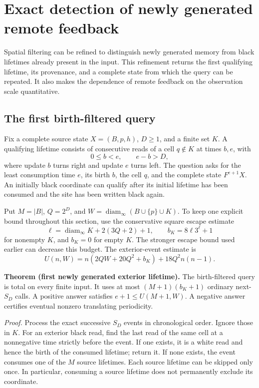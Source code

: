 \section{Exact detection of newly generated remote feedback}
\label{sec:birth-feedback}
Spatial filtering can be refined to distinguish newly generated memory from
black lifetimes already present in the input. This refinement returns the
first qualifying lifetime, its provenance, and a complete state from which
the query can be repeated. It also makes the dependence of remote feedback
on the observation scale quantitative.

\subsection{The first birth-filtered query}
Fix a complete source state \(X=(B,p,h)\), \(D\ge1\), and a finite set
\(K\). A qualifying lifetime consists of consecutive reads of a cell
\(q\notin K\) at times \(b,e\), with
\[
 0\le b<e,\qquad e-b>D,
\]
where update \(b\) turns right and update \(e\) turns left. The question
asks for the least consumption time \(e\), its birth \(b\), the cell
\(q\), and the complete state \(F^{e+1}X\). An initially black coordinate
can qualify after its initial lifetime has been consumed and the site has
been written black again.

Put \(M=|B|\), \(Q=2^D\), and
\(W=\operatorname{diam}_\infty(B\cup\{p\}\cup K)\). To keep one explicit
bound throughout this section, use the conservative square escape estimate
\[
 \ell=\operatorname{diam}_\infty K+2(3Q+2)+1,
 \qquad b_K=8\ell3^\ell+1
\]
for nonempty \(K\), and \(b_K=0\) for empty \(K\). The stronger escape
bound used earlier can decrease this budget. The exterior-event estimate is
\[
 U(n,W)=n(2QW+20Q^2+b_K)+18Q^2n(n-1).
\]

\textbf{Theorem (first newly generated exterior lifetime).}
The birth-filtered query is total on every finite input. It uses at most
\((M+1)(b_K+1)\) ordinary next-\(S_D\) calls. A positive answer satisfies
\(e+1\le U(M+1,W)\). A negative answer certifies eventual nonzero translating
periodicity.

\textit{Proof.}
Process the exact successive \(S_D\) events in chronological order. Ignore
those in \(K\). For an exterior black read, find the last read of the same
cell at a nonnegative time strictly before the event. If one exists, it is
a white read and hence the birth of the consumed lifetime; return it.
If none exists, the event consumes one of the \(M\) source lifetimes.
Each source lifetime can be skipped only once. In particular, consuming a
source lifetime does not permanently exclude its coordinate.

